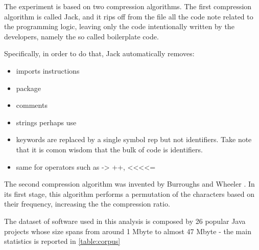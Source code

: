 
The experiment is based on two compression algorithms.
The first compression algorithm is called Jack, and it rips off from the file all the code note related to the programming logic, leaving
only the code intentionally written by the developers, namely the so called boilerplate code.

Specifically, in order to do that, Jack automatically removes:

\begin{itemize}
\item imports instructions
\item package
\item comments
\item strings perhaps use
\item keywords are replaced by a single symbol rep
but not identifiers. Take note that it is comon wisdom that the bulk of code is identifiers.
\item same for operators such as -> ++, <<<<=
\end{itemize}

The second compression algorithm was invented by Burroughs and Wheeler \cite{Burrows:Wheeler:1994}.
In its first stage, this algorithm performs a permutation of the characters based on their frequency, increasing the 
the compression ratio.  

The dataset of software used in this analysis is composed by 26 popular Java
projects whose size spans from around 1 Mbyte to almost 47 Mbyte - the main
statistics is reported in \cref{table:corpus}

\begin{table}
  \label{table:corpus}
  \caption{The results of the compression using the Burroughs-Wheeler algorithm}
  \centering
\end{table}
